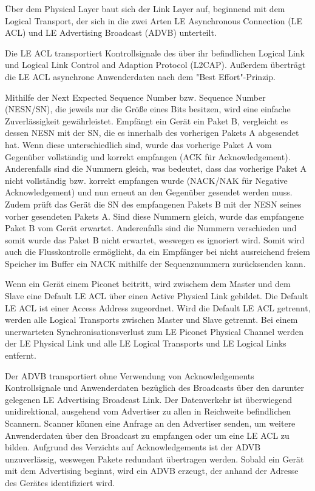 Über dem Physical Layer baut sich der Link Layer auf, beginnend mit dem Logical Transport, der sich in die zwei Arten LE Asynchronous Connection (LE ACL) und LE Advertising Broadcast (ADVB) unterteilt.

Die LE ACL transportiert Kontrollsignale des über ihr befindlichen Logical Link und Logical Link Control and Adaption Protocol (L2CAP). Außerdem überträgt die LE ACL asynchrone Anwenderdaten nach dem "Best Effort"-Prinzip.

Mithilfe der Next Expected Sequence Number bzw. Sequence Number (NESN/SN), die jeweils nur die Größe eines Bits besitzen, wird eine einfache Zuverlässigkeit gewährleistet. Empfängt ein Gerät ein Paket B, vergleicht es dessen NESN mit der SN, die es innerhalb des vorherigen Pakets A abgesendet hat. Wenn diese unterschiedlich sind, wurde das vorherige Paket A vom Gegenüber vollständig und korrekt empfangen (ACK für Acknowledgement). Anderenfalls sind die Nummern gleich, was bedeutet, dass das vorherige Paket A nicht vollständig bzw. korrekt empfangen wurde (NACK/NAK für Negative Acknowledgement) und nun erneut an den Gegenüber gesendet werden muss. Zudem prüft das Gerät die SN des empfangenen Pakets B mit der NESN seines vorher gesendeten Pakets A. Sind diese Nummern gleich, wurde das empfangene Paket B vom Gerät erwartet. Anderenfalls sind die Nummern verschieden und somit wurde das Paket B nicht erwartet, weswegen es ignoriert wird. Somit wird auch die Flusskontrolle ermöglicht, da ein Empfänger bei nicht ausreichend freiem Speicher im Buffer ein NACK mithilfe der Sequenznummern zurücksenden kann.

Wenn ein Gerät einem Piconet beitritt, wird zwischem dem Master und dem Slave eine Default LE ACL über einen Active Physical Link gebildet. Die Default LE ACL ist einer Access Address zugeordnet. Wird die Default LE ACL getrennt, werden alle Logical Transports zwischen Master und Slave getrennt. Bei einem unerwarteten Synchronisationsverlust zum LE Piconet Physical Channel werden der LE Physical Link und alle LE Logical Transports und LE Logical Links entfernt.

Der ADVB transportiert ohne Verwendung von Acknowledgements Kontrollsignale und Anwenderdaten bezüglich des Broadcasts über den darunter gelegenen LE Advertising Broadcast Link. Der Datenverkehr ist überwiegend unidirektional, ausgehend vom Advertiser zu allen in Reichweite befindlichen Scannern. Scanner können eine Anfrage an den Advertiser senden, um weitere Anwenderdaten über den Broadcast zu empfangen oder um eine LE ACL zu bilden. Aufgrund des Verzichts auf Acknowledgements ist der ADVB unzuverlässig, weswegen Pakete redundant übertragen werden. Sobald ein Gerät mit dem Advertising beginnt, wird ein ADVB erzeugt, der anhand der Adresse des Gerätes identifiziert wird.
